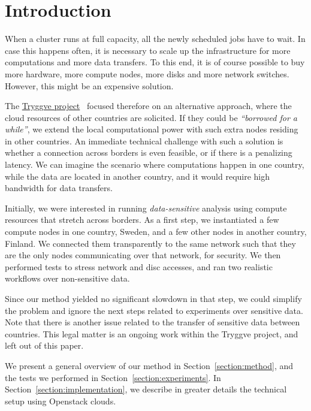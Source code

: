\section{Introduction}
\label{section:intro}

When a cluster runs at full capacity, all the newly scheduled jobs
have to wait. In case this happens often, it is necessary to scale up
the infrastructure for more computations and more data transfers. To
this end, it is of course possible to buy more hardware, \ie more
compute nodes, more disks and more network switches. However, this
might be an expensive solution.

The \href{https://wiki.neic.no/wiki/Tryggve}{Tryggve
  project}~\cite{tryggve} focused therefore on an alternative
approach, where the cloud resources of other countries are solicited.
%
If they could be \emph{``borrowed for a while''}, we extend the local
computational power with such extra nodes residing in other countries.
%
An immediate technical challenge with such a solution is whether a
connection across borders is even feasible, or if there is a
penalizing latency. We can imagine the scenario where computations
happen in one country, while the data are located in another country,
and it would require high bandwidth for data transfers.

Initially, we were interested in running \emph{data-sensitive}
analysis using compute resources that stretch across borders.
%
As a first step, we instantiated a few compute nodes in one country,
Sweden, and a few other nodes in another country, Finland. We
connected them transparently to the same network such that they are
the only nodes communicating over that network, for security. We then
performed tests to stress network and disc accesses, and ran two
realistic workflows over non-sensitive data.

Since our method yielded no significant slowdown in that step, we
could simplify the problem and ignore the next steps related to
experiments over sensitive data.
%
Note that there is another issue related to the transfer of sensitive
data between countries. This legal matter is an ongoing work within
the Tryggve project, and left out of this paper.

We present a general overview of our method in
Section~\ref{section:method}, and the tests we performed in
Section~\ref{section:experiments}.
%
In Section~\ref{section:implementation}, we describe in greater
details the technical setup using Openstack clouds.
